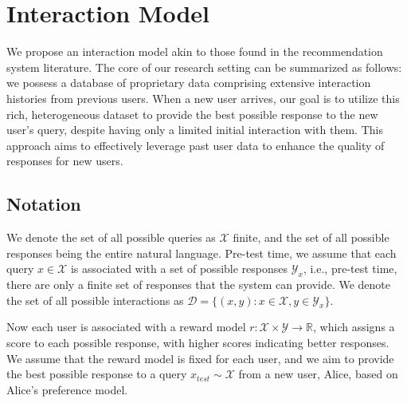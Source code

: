 \section{Interaction Model}

\label{sec:interaction-model}
We propose an interaction model akin to those found in the recommendation system literature. The core of our research setting can be summarized as follows: we possess a database of proprietary data comprising extensive interaction histories from previous users. When a new user arrives, our goal is to utilize this rich, heterogeneous dataset to provide the best possible response to the new user's query, despite having only a limited initial interaction with them. This approach aims to effectively leverage past user data to enhance the quality of responses for new users. 

\subsection{Notation}
We denote the set of all possible queries as $\mathcal{X}$ finite, and the set of all possible responses being the entire natural language. Pre-test time, we assume that each query $x \in \mathcal{X}$ is associated with a set of possible responses $\mathcal{Y}_x$, i.e., pre-test time, there are only a finite set of responses that the system can provide. We denote the set of all possible interactions as $\mathcal{D} = \{(x,y): x\in \mathcal{X}, y\in \mathcal{Y}_x\}$. 

Now each user is associated with a reward model $r: \mathcal{X} \times \mathcal{Y} \rightarrow \mathbb{R}$, which assigns a score to each possible response, with higher scores indicating better responses. We assume that the reward model is fixed for each user, and we aim to provide the best possible response to a query $x_{test} \sim \mathcal{X}$ from a new user, Alice, based on Alice's preference model.


